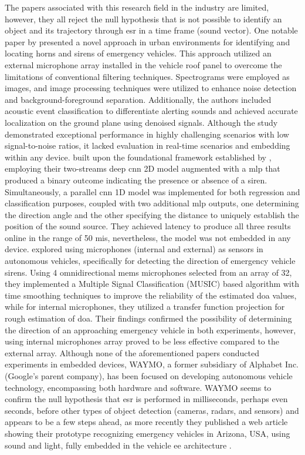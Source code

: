 The papers associated with this research field in the industry are limited, however, they all reject the null hypothesis that is not possible to identify an object and its trajectory through \gls{esr} in a time frame (sound vector). One notable paper by \textcite{Marchegiani2022} presented a novel approach in urban environments for identifying and locating horns and sirens of emergency vehicles. This approach utilized an external microphone array installed in the vehicle roof panel to overcome the limitations of conventional filtering techniques. Spectrograms were employed as images, and image processing techniques were utilized to enhance noise detection and background-foreground separation. Additionally, the authors included acoustic event classification to differentiate alerting sounds and achieved accurate localization on the ground plane using denoised signals. Although the study demonstrated exceptional performance in highly challenging scenarios with low signal-to-noise ratios, it lacked evaluation in real-time scenarios and embedding within any device. \textcite{Sun2021} built upon the foundational framework established by \textcite{Tran2020}, employing their two-streams deep \gls{cnn} 2D model augmented with a \gls{mlp} that produced a binary outcome indicating the presence or absence of a siren. Simultaneously, a parallel \gls{cnn} 1D model was implemented for both regression and classification purposes, coupled with two additional \gls{mlp} outputs, one determining the direction angle and the other specifying the distance to uniquely establish the position of the sound source. They achieved latency to produce all three results online in the range of 50 \gls{mi}\gls{s}, nevertheless, the model was not embedded in any device. \textcite{Shabtai2019} explored using microphones (internal and external) as sensors in autonomous vehicles, specifically for detecting the direction of emergency vehicle sirens. Using 4 omnidirectional \gls{mems} microphones selected from an array of 32, they implemented a Multiple Signal Classification (MUSIC) based algorithm with time smoothing techniques to improve the reliability of the estimated \gls{doa} values, while for internal microphones, they utilized a transfer function projection for rough estimation of \gls{doa}. Their findings confirmed the possibility of determining the direction of an approaching emergency vehicle in both experiments, however, using internal microphones array proved to be less effective compared to the external array. Although none of the aforementioned papers conducted experiments in embedded devices, WAYMO, a former subsidiary of Alphabet Inc. (Google's parent company), has been focused on developing autonomous vehicle technology, encompassing both hardware and software. WAYMO seems to confirm the null hypothesis that \gls{esr} is performed in milliseconds, perhaps even seconds, before other types of object detection (cameras, radars, and sensors) and appears to be a few steps ahead, as more recently they published a web article showing their prototype recognizing emergency vehicles in Arizona, USA, using sound and light, fully embedded in the vehicle \gls{ee} architecture \cite{WAYMO2023}. 

